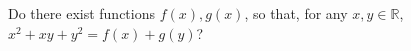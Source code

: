 Do there exist functions $f(x), g(x)$, so that, for any $x, y \in \mathbb{R}$, $x^2 + xy + y^2 = f(x) + g(y)$?
